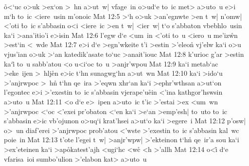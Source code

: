 \r{o}<`uc
o>uk
>ex`on
>~hn
a>ut~w|
vfage~in
o>ud`e
to~ic
met>
a>uto~u
e>i
m`h
to~ic
<iere~usin
m'onoic\bibvsend
\vs Mat 12:5
>`h
o>uk
>an'egnwte
>en
t~w|
n'omw|
<'oti
\r{t}o~ic
s'abbasin
o<i
<iere~ic
>en
t~w|
<ier~w|
t`o
s'abbaton
vbebhlo~usin
ka`i
>ana'itio'i
e>isin\bibvsend
\vs Mat 12:6
l'egw
d`e
<um~in
<'oti
to~u
<iero~u
me'iz\r{w}n
>est`in
<~wde\bibvsend
\vs Mat 12:7
e>i
d`e
>egn'wkeite
t'i
>estin
>'eleo\r{n}
vj'elw
ka`i
o>u
vjus'ian
o>uk
>`an
katedik'asate
to`uc
>anait'iouc\bibvsend
\vs Mat 12:8
k'urioc
g'ar
>estin
ka`i\r{}
to~u
sabb'atou
<o
u<i`oc
to~u
>anjr'wpou\bibvsend
\vs Mat 12:9
ka`i
metab`ac
>eke~ijen
>~hlj\r{e}n
e>ic
t`hn
sunagwg`hn
a>ut~wn\bibvsend
\vs Mat 12:10
ka`i
>ido`u
>'anjrwpoc
>~hn\r{}
t`hn
qe~ira
>'eqwn
xhr`an
ka`i
>ephr'wthsan
a>ut`on
l'egontec
e>i
>'exestin
to~ic
s'abbasin
vjerape'u\r{e}in
<'ina
kathgor'hswsin
a>uto~u\bibvsend
\vs Mat 12:11
<o
d`e
e>~ipen
a>uto~ic
t'ic
>'estai
>ex
<um~wn
>'anjrwpoc
<`oc
<'exei
pr'obaton
<`en
ka`i
>e`an
>emp'esh|
to~uto
to~ic
s'abbasin
e>ic
vb'ojunon
o>uq`i
krat'hsei
a>ut`o
ka`i
>egere~i\bibvsend
\vs Mat 12:12
p'osw|
o>~un
diaf'erei
>'anjrwpoc
prob'atou
<'wste
>'exestin
to~ic
s'abbasin
kal~wc
poie~in\bibvsend
\vs Mat 12:13
t'ote
l'egei
t~w|
>anjr'wpw|
>'ekteinon
t`hn\r{}
qe~ir'a
sou
ka`i
>ex'eteinen
ka`i
>ap\r{o}katest'ajh
<ugi`hc
<wc\r{}
<h
>'allh\bibvsend
\vs Mat 12:14
o<i\r{}
d`e
vfarisa~ioi
sumbo'ulion
>'elabon
kat>
a>uto~u
